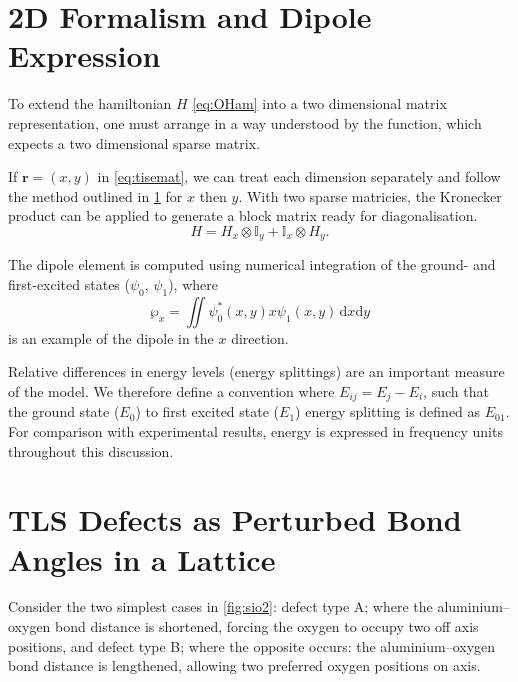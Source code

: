 \section[\lin{2D} Formalism and Dipole Expression]{2D Formalism and Dipole Expression}\label{sec:methdipole}

To extend the hamiltonian $H$ \cref{eq:OHam} into a two dimensional matrix representation, one must arrange in a way understood by the  function, which expects a two dimensional sparse matrix.

If $\mathbf{r}=(x,y)$ in \cref{eq:tisemat}, we can treat each dimension separately and follow the method outlined in \cref{sec:methdipole} for $x$ then $y$.
With two sparse matricies, the Kronecker product can be applied to generate a block matrix ready for diagonalisation.
\begin{equation}
H = H_x \otimes \mathbb{I}_y + \mathbb{I}_x \otimes H_y.
\label{eq:h2d}
\end{equation}

The dipole element is computed using numerical integration of the ground- and first-excited states ($\psi_0$, $\psi_1$), where
\begin{equation}
    \wp_x = \iint \psi_0^*(x,y) x \psi_1(x,y) \,\mathrm{d}x\mathrm{d}y
    \label{eq:dipole}
\end{equation}
is an example of the dipole in the $x$ direction.

Relative differences in energy levels (\ie energy splittings) are an important measure of the model.
We therefore define a convention where $E_{ij} = E_j-E_i$, such that the ground state ($E_0$) to first excited state ($E_1$) energy splitting is defined as $E_{01}$.
For comparison with experimental results, energy is expressed in frequency units throughout this discussion.

\section[TLSs as Perturbed Bond Angles]{TLS Defects as Perturbed Bond Angles in a Lattice}\label{sec:bonds}

Consider the two simplest cases in \cref{fig:sio2}: defect type A; where the aluminium--oxygen bond distance is shortened, forcing the oxygen to occupy two off axis positions, and defect type B; where the opposite occurs: the aluminium--oxygen bond distance is lengthened, allowing two preferred oxygen positions on axis.

